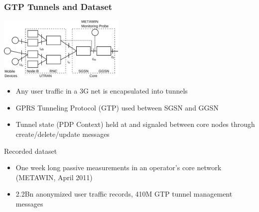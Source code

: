 \documentclass{beamer}
\begin{document}
\begin{frame}
    \frametitle{GTP Tunnels and Dataset}

      \begin{center}
		\includegraphics[height=3cm]{../../chapters/04-mobilenets/images/umts-network.pdf}
	\end{center}


    \begin{itemize}
		\item Any user traffic in a 3G net is encapsulated into tunnels
		\item GPRS Tunneling Protocol (GTP) used between SGSN and GGSN
		\item Tunnel state (PDP Context) held at and signaled between core nodes through create/delete/update messages
	\end{itemize}
	Recorded dataset
	\begin{itemize}
		\item One week long passive measurements in an operator's core network (METAWIN, April 2011)
		\item 2.2Bn anonymized user traffic records, 410M GTP tunnel management messages
	\end{itemize}
\end{frame}
\end{document}
